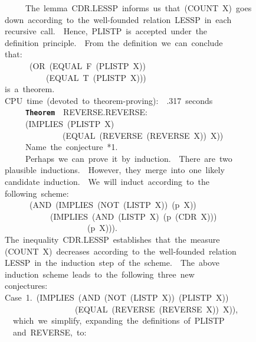\documentclass[11pt]{book}
\newenvironment{pubasis}{\begin{flushleft}\ttfamily\small}{\normalsize\rmfamily\end{flushleft}}
\newcommand{\axiomordefinition}[1]{\vspace{6pt}\texttt{\textbf{#1}}}
\begin{document}
\begin{pubasis}
~~~~~The~lemma~CDR.LESSP~informs~us~that~(COUNT~X)~goes\\
down~according~to~the~well-founded~relation~LESSP~in~each\\
recursive~call.~~Hence,~PLISTP~is~accepted~under~the\\
definition~principle.~~From~the~definition~we~can~conclude\\
that:\\
~~~~~~(OR~(EQUAL~F~(PLISTP~X))\\
~~~~~~~~~~(EQUAL~T~(PLISTP~X)))\\
is~a~theorem.\\

CPU~time~(devoted~to~theorem-proving):~~.317~seconds\\

~~~~~\axiomordefinition{Theorem}~~REVERSE.REVERSE:\\
~~~~~(IMPLIES~(PLISTP~X)\\
~~~~~~~~~~~~~~(EQUAL~(REVERSE~(REVERSE~X))~X))\\

~~~~~Name~the~conjecture~*1.\\

~~~~~Perhaps~we~can~prove~it~by~induction.~~There~are~two\\
plausible~inductions.~~However,~they~merge~into~one~likely\\
candidate~induction.~~We~will~induct~according~to~the\\
following~scheme:\\
~~~~~~(AND~(IMPLIES~(NOT~(LISTP~X))~(p~X))\\
~~~~~~~~~~~(IMPLIES~(AND~(LISTP~X)~(p~(CDR~X)))\\
~~~~~~~~~~~~~~~~~~~~(p~X))).\\
The~inequality~CDR.LESSP~establishes~that~the~measure\\
(COUNT~X)~decreases~according~to~the~well-founded~relation\\
LESSP~in~the~induction~step~of~the~scheme.~~The~above\\
induction~scheme~leads~to~the~following~three~new\\
conjectures:\\

Case~1.~(IMPLIES~(AND~(NOT~(LISTP~X))~(PLISTP~X))\\
~~~~~~~~~~~~~~~~~(EQUAL~(REVERSE~(REVERSE~X))~X)),\\

~~which~we~simplify,~expanding~the~definitions~of~PLISTP\\
~~and~REVERSE,~to:\\


\end{pubasis}
\end{document}
